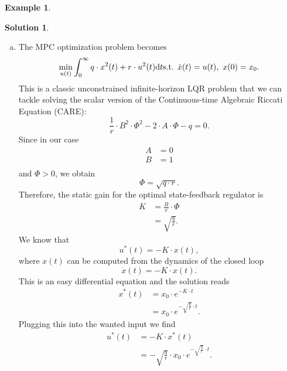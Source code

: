 \documentclass[a4paper,12 pt]{article}
\numberwithin{equation}{section}
\theoremstyle{definition}
\newtheorem{bsp}{Example}
\theoremstyle{remark}
\theoremstyle{definition}
\newtheorem*{lsg}{Solution}
\theoremstyle{definition}
\theoremstyle{definition}
\theoremstyle{remark}
\begin{document}
\begin{bsp}
\begin{lsg}
\begin{enumerate}[(a)]
\item The MPC optimization problem becomes
\begin{equation*}
\min_{u(t)}\int_0^\infty q\cdot x^2(t)+r\cdot u^2(t)\text{d}t\\
\text{s.t. } \dot{x}(t)=u(t),\ x(0)=x_0. 
\end{equation*}
This is a classic unconstrained infinite-horizon LQR problem that we can tackle solving the scalar version of the Continuous-time Algebraic Riccati Equation (CARE):
\begin{equation*}
\frac{1}{r}\cdot B^2 \cdot \Phi^2-2\cdot A\cdot \Phi -q=0.
\end{equation*}
Since in our case
\begin{equation*}
\begin{split}
A&=0\\
B&=1\\
\end{split}
\end{equation*}
and $\Phi>0$, we obtain
\begin{equation*}
\Phi=\sqrt{q\cdot r}.
\end{equation*}
Therefore, the static gain for the optimal state-feedback regulator is 
\begin{equation*}
\begin{split}
K&=\frac{B}{r}\cdot \Phi\\
&=\sqrt{\frac{q}{r}}.
\end{split}
\end{equation*}
We know that 
\begin{equation*}
u^*(t)=-K\cdot x(t),
\end{equation*}
where $x(t)$ can be computed from the dynamics of the closed loop
\begin{equation*}
\dot{x}(t)=-K\cdot x(t).
\end{equation*}
This is an easy differential equation and the solution reads
\begin{equation*}
\begin{split}
x^*(t)&=x_0\cdot e^{-K\cdot t}\\
&=x_0\cdot e^{-\sqrt{\frac{q}{r}}\cdot t}.
\end{split}
\end{equation*}
Plugging this into the wanted input we find
\begin{equation*}
\begin{split}
u^*(t)&=-K\cdot x^*(t)\\
&=-\sqrt{\frac{q}{r}}\cdot x_0 \cdot e^{-\sqrt{\frac{q}{r}}\cdot t}.
\end{split}

\end{equation*}
\end{enumerate}
\end{lsg}
\end{bsp}
\end{document}
